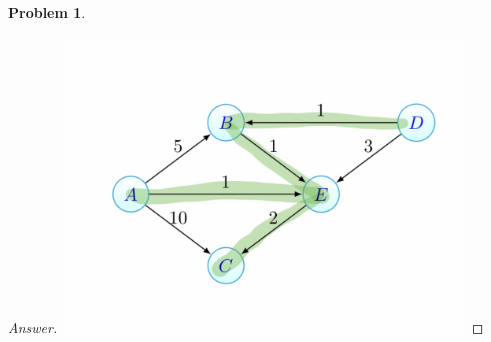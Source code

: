 \documentclass[11pt]{article}
\theoremstyle{definition}
\theoremstyle{definition}
\newtheorem{required}{Problem}
\theoremstyle{definition}
\begin{document}
\begin{required}
\begin{proof}[Answer]
\includegraphics[width=0.8\textwidth]{q23}

\end{proof}


\end{required}

\end{document}
